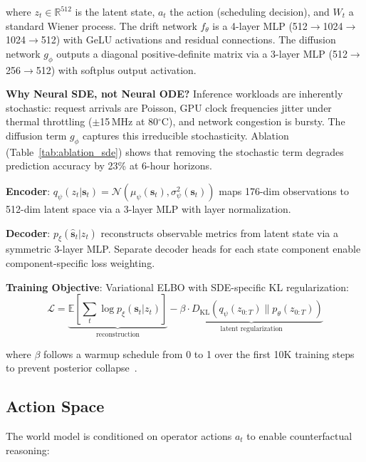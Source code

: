 \documentclass[conference,10pt]{IEEEtran}
\begin{document}
where $z_t \in \mathbb{R}^{512}$ is the latent state, $a_t$ the action (scheduling decision), and $W_t$ a standard Wiener process. The drift network $f_\theta$ is a 4-layer MLP (512$\to$1024$\to$1024$\to$512) with GeLU activations and residual connections. The diffusion network $g_\phi$ outputs a diagonal positive-definite matrix via a 3-layer MLP (512$\to$256$\to$512) with softplus output activation.

\textbf{Why Neural SDE, not Neural ODE?} Inference workloads are inherently stochastic: request arrivals are Poisson, GPU clock frequencies jitter under thermal throttling ($\pm$15\,MHz at 80$^\circ$C), and network congestion is bursty. The diffusion term $g_\phi$ captures this irreducible stochasticity. Ablation (Table~\ref{tab:ablation_sde}) shows that removing the stochastic term degrades prediction accuracy by 23\% at 6-hour horizons.

\textbf{Encoder}: $q_\psi(z_t | \mathbf{s}_t) = \mathcal{N}(\mu_\psi(\mathbf{s}_t), \sigma^2_\psi(\mathbf{s}_t))$ maps 176-dim observations to 512-dim latent space via a 3-layer MLP with layer normalization.

\textbf{Decoder}: $p_\xi(\hat{\mathbf{s}}_t | z_t)$ reconstructs observable metrics from latent state via a symmetric 3-layer MLP. Separate decoder heads for each state component enable component-specific loss weighting.

\textbf{Training Objective}: Variational ELBO with SDE-specific KL regularization:
\begin{equation}
\mathcal{L} = \underbrace{\mathbb{E}\!\left[\sum_{t}\log p_\xi(\mathbf{s}_t | z_t)\right]}_{\text{reconstruction}} - \underbrace{\beta \cdot D_{\mathrm{KL}}\!\left(q_\psi(z_{0:T}) \| p_\theta(z_{0:T})\right)}_{\text{latent regularization}}
\end{equation}

where $\beta$ follows a warmup schedule from 0 to 1 over the first 10K training steps to prevent posterior collapse~\cite{kingma2014vae}.

\subsection{Action Space}

The world model is conditioned on operator actions $a_t$ to enable counterfactual reasoning:
\end{document}
